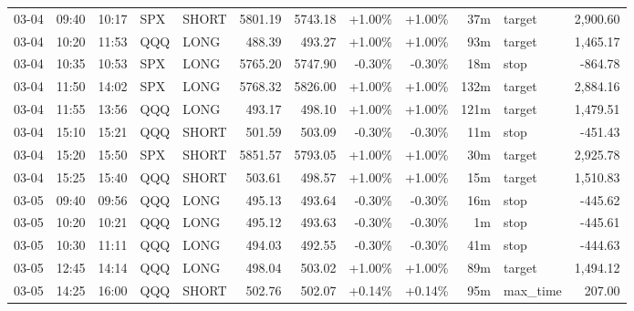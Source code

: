 \documentclass[11pt,a4paper,twoside]{article}
\begin{document}
\begin{center}
\begin{longtable}{>{\color{txtmain}}l l l l l r r r r r >{\color{txtmain}}l r}
03-04 & 09:40 & 10:17 & SPX & SHORT & 5801.19 & 5743.18 & \textcolor{wingreen}{+1.00\%} & \textcolor{wingreen}{+1.00\%} & 37m & target & \textcolor{wingreen}{2,900.60} \\
03-04 & 10:20 & 11:53 & QQQ & LONG & 488.39 & 493.27 & \textcolor{wingreen}{+1.00\%} & \textcolor{wingreen}{+1.00\%} & 93m & target & \textcolor{wingreen}{1,465.17} \\
03-04 & 10:35 & 10:53 & SPX & LONG & 5765.20 & 5747.90 & \textcolor{lossred}{-0.30\%} & \textcolor{lossred}{-0.30\%} & 18m & stop & \textcolor{lossred}{-864.78} \\
03-04 & 11:50 & 14:02 & SPX & LONG & 5768.32 & 5826.00 & \textcolor{wingreen}{+1.00\%} & \textcolor{wingreen}{+1.00\%} & 132m & target & \textcolor{wingreen}{2,884.16} \\
03-04 & 11:55 & 13:56 & QQQ & LONG & 493.17 & 498.10 & \textcolor{wingreen}{+1.00\%} & \textcolor{wingreen}{+1.00\%} & 121m & target & \textcolor{wingreen}{1,479.51} \\
03-04 & 15:10 & 15:21 & QQQ & SHORT & 501.59 & 503.09 & \textcolor{lossred}{-0.30\%} & \textcolor{lossred}{-0.30\%} & 11m & stop & \textcolor{lossred}{-451.43} \\
03-04 & 15:20 & 15:50 & SPX & SHORT & 5851.57 & 5793.05 & \textcolor{wingreen}{+1.00\%} & \textcolor{wingreen}{+1.00\%} & 30m & target & \textcolor{wingreen}{2,925.78} \\
03-04 & 15:25 & 15:40 & QQQ & SHORT & 503.61 & 498.57 & \textcolor{wingreen}{+1.00\%} & \textcolor{wingreen}{+1.00\%} & 15m & target & \textcolor{wingreen}{1,510.83} \\
03-05 & 09:40 & 09:56 & QQQ & LONG & 495.13 & 493.64 & \textcolor{lossred}{-0.30\%} & \textcolor{lossred}{-0.30\%} & 16m & stop & \textcolor{lossred}{-445.62} \\
03-05 & 10:20 & 10:21 & QQQ & LONG & 495.12 & 493.63 & \textcolor{lossred}{-0.30\%} & \textcolor{lossred}{-0.30\%} & 1m & stop & \textcolor{lossred}{-445.61} \\
03-05 & 10:30 & 11:11 & QQQ & LONG & 494.03 & 492.55 & \textcolor{lossred}{-0.30\%} & \textcolor{lossred}{-0.30\%} & 41m & stop & \textcolor{lossred}{-444.63} \\
03-05 & 12:45 & 14:14 & QQQ & LONG & 498.04 & 503.02 & \textcolor{wingreen}{+1.00\%} & \textcolor{wingreen}{+1.00\%} & 89m & target & \textcolor{wingreen}{1,494.12} \\
03-05 & 14:25 & 16:00 & QQQ & SHORT & 502.76 & 502.07 & \textcolor{wingreen}{+0.14\%} & \textcolor{wingreen}{+0.14\%} & 95m & max\_time & \textcolor{wingreen}{207.00} \\

\end{longtable}
\end{center}
\end{document}
